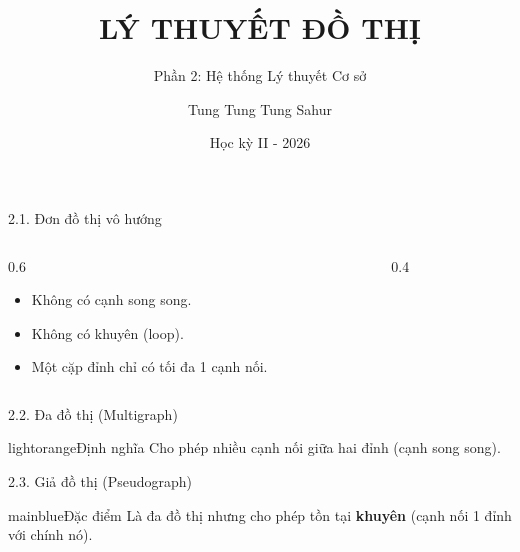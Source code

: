 \documentclass[10pt, xcolor={dvipsnames}]{beamer}
\title{LÝ THUYẾT ĐỒ THỊ}
\subtitle{Phần 2: Hệ thống Lý thuyết Cơ sở}
\author{Tung Tung Tung Sahur}
\date{Học kỳ II - 2026}
\begin{document}
\frame{\titlepage}

\begin{frame}{2.1. Đơn đồ thị vô hướng}
    \begin{columns}
        \begin{column}{0.6\textwidth}
            \begin{itemize}
                \item Không có cạnh song song.
                \item Không có khuyên (loop).
                \item Một cặp đỉnh chỉ có tối đa 1 cạnh nối.
            \end{itemize}
        \end{column}
        \begin{column}{0.4\textwidth}
            \centering
        \end{column}
    \end{columns}
\end{frame}

\begin{frame}{2.2. Đa đồ thị (Multigraph)}
    \centering
    \begin{detailbox}{lightorange}{Định nghĩa}
        Cho phép nhiều cạnh nối giữa hai đỉnh (cạnh song song).
    \end{detailbox}
\end{frame}

\begin{frame}{2.3. Giả đồ thị (Pseudograph)}
    \centering
    \begin{detailbox}{mainblue}{Đặc điểm}
        Là đa đồ thị nhưng cho phép tồn tại \textbf{khuyên} (cạnh nối 1 đỉnh với chính nó).
    \end{detailbox}
\end{frame}
\end{document}
